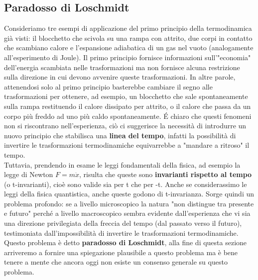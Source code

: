 \documentclass[10pt,a4paper]{article}
\begin{document}
\subsection{Paradosso di Loschmidt}
Consideriamo tre esempi di applicazione del primo principio della termodinamica già visti: il blocchetto che scivola su una rampa con attrito, due corpi in contatto che scambiano calore e l'espansione adiabatica di un gas nel vuoto (analogamente all'esperimento di Joule). Il primo principio fornisce informazioni sull'"economia" dell'energia scambiata nelle trasformazioni ma non fornisce alcuna restrizione sulla direzione in cui devono avvenire queste trasformazioni. In altre parole, attenendosi solo al primo principio basterebbe cambiare il segno alle trasformazioni per ottenere, ad esempio, un blocchetto che sale spontaneamente sulla rampa restituendo il calore dissipato per attrito, o il calore che passa da un corpo più freddo ad uno più caldo spontaneamente. \'{E} chiaro che questi fenomeni non si riscontrano nell'esperienza, ciò ci suggerisce la necessità di introdurre un nuovo principio che stabilisca una \textbf{linea del tempo}, infatti la possibilità di invertire le trasformazioni termodinamiche equivarrebbe a "mandare a ritroso" il tempo.\\
Tuttavia, prendendo in esame le leggi fondamentali della fisica, ad esempio la legge di Newton \(F = m \ddot{x}\), risulta che queste sono \textbf{invarianti rispetto al tempo} (o t-invarianti), cioè sono valide sia per t che per -t. Anche se considerassimo le leggi della fisica quantistica, anche queste godono di t-invarianza. Sorge quindi un problema profondo: se a livello microscopico la natura "non distingue tra presente e futuro" perché a livello macroscopico sembra evidente dall'esperienza che vi sia una direzione privilegiata della freccia del tempo (dal passato verso il futuro), testimoniata dall'impossibilità di invertire le trasformazioni termodinamiche. Questo problema è detto \textbf{paradosso di Loschmidt}, alla fine di questa sezione arriveremo a fornire una spiegazione plausibile a questo problema ma è bene tenere a mente che ancora oggi non esiste un consenso generale su questo problema.\\
\end{document}
